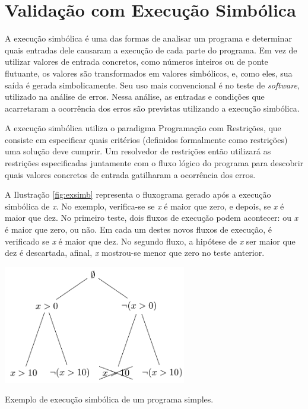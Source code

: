 \section{Validação com Execução Simbólica}

\label{simbolics}

A execução simbólica é uma das formas de analisar um programa e determinar quais entradas dele causaram a execução de cada parte do programa. Em vez de utilizar valores de entrada concretos, como números inteiros ou de ponte flutuante, os valores são transformados em valores simbólicos, e, como eles, sua saída é gerada simbolicamente. Seu uso mais convencional é no teste de \textit{software}, utilizado na análise de erros. Nessa análise, as entradas e condições que acarretaram a ocorrência dos erros são previstas utilizando a execução simbólica. 

A execução simbólica utiliza o paradigma Programação com Restrições, que consiste em especificar quais critérios (definidos formalmente como restrições) uma solução deve cumprir. Um resolvedor de restrições então utilizará as restrições especificadas juntamente com o fluxo lógico do programa para descobrir quais valores concretos de entrada gatilharam a ocorrência dos erros.

A Ilustração \ref{fig:exsimb} representa o fluxograma gerado após a execução simbólica de \textit{x}. No exemplo, verifica-se se \textit{x} é maior que zero, e depois, se \textit{x} é maior que dez. No primeiro teste, dois fluxos de execução podem acontecer: ou \textit{x} é maior que zero, ou não. Em cada um destes novos fluxos de execução, é verificado se \textit{x} é maior que dez. No segundo fluxo, a hipótese de \textit{x} ser maior que dez é descartada, afinal, \textit{x} mostrou-se menor que zero no teste anterior.  

\begin{ilustracao}
	\begin{center}
		\includegraphics[width=0.6\textwidth]{imagens/exemplosimbolic.png}
		
		\caption[Exemplo de execução simbólica de um programa simples.]{Exemplo de execução simbólica de um programa simples.}
		\label{fig:exsimb}	
	\end{center}

\end{ilustracao}


